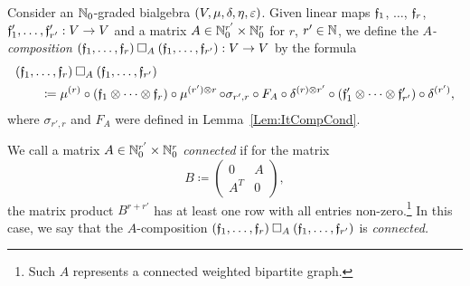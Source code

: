 \documentclass[\MainFolder/Text.tex]{subfiles}
\begin{document}
\begin{Definition}\label{Def:ConComp}
Consider an $\mathbb{N}_0$-graded bialgebra $(V,\mu,\delta,\eta,\varepsilon)$. Given linear maps $\mathfrak{f}_1$, $\dotsc$, $\mathfrak{f}_r$, $\mathfrak{f}_1', \dotsc, \mathfrak{f}_{r'}': V \rightarrow V$ and a matrix $A\in \mathbb{N}_0^{r'} \times \mathbb{N}_0^r$ for $r$, $r'\in \mathbb{N}$, we define the \emph{$A$-composition} $(\MVMorF_1,\dotsc,\MVMorF_r)\SquareComp_A(\MVMorF_1,\dotsc,\MVMorF_{r'}): V \rightarrow V$ by the formula
\begin{align*}
&(\MVMorF_1,\dotsc,\MVMorF_r)\SquareComp_A(\MVMorF_1,\dotsc,\MVMorF_{r'}) \\
&\qquad\coloneqq \MVProd^{(r)}\circ(\MVMorF_1 \otimes \dotsb \otimes \MVMorF_r)\circ \Prod^{(r')\otimes r} \circ  \sigma_{r',r}\circ F_A \circ \MVCoProd^{(r)\otimes r'} \circ (\MVMorF_1' \otimes \dotsb \otimes \MVMorF_{r'}')\circ\MVCoProd^{(r')},
\end{align*}
where $\sigma_{r',r}$ and $F_A$ were defined in Lemma~\ref{Lem:ItCompCond}.

We call a matrix $A\in\mathbb{N}_0^{r'} \times \mathbb{N}_0^{r}$ \emph{connected} if for the matrix
$$ B \coloneqq \begin{pmatrix} 0 & A \\ A^T & 0 \end{pmatrix}, $$
the matrix product $B^{r+r'}$ has at least one row with all entries non-zero.\footnote{Such $A$ represents a connected weighted bipartite graph.} In this case, we say that the $A$-composition $(\MVMorF_1,\dotsc,\MVMorF_r)\SquareComp_A(\MVMorF_1,\dotsc,\MVMorF_{r'})$ is \emph{connected.}


\end{Definition}
\end{document}

